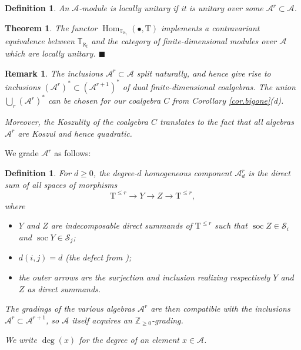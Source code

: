 \documentclass[11pt]{article}
\theoremstyle{plain}
\newtheorem{theorem}[lemma]{Theorem}
\theoremstyle{nonumberplain}
\theoremstyle{plain}
\newtheorem{definition}[lemma]{Definition}
\newtheorem{remark}[lemma]{Remark}
\theoremstyle{nonumberplain}
\newcommand\bT{\mathbb T}
\newcommand\cA{\mathcal A}
\newcommand\cS{\mathcal S}
\DeclareMathOperator{\Hom}{\mathrm{Hom}}
\DeclareMathOperator{\soc}{\mathrm{soc}}
\newcommand{\qedhere}{\mbox{}\hfill\ensuremath{\blacksquare}}
\begin{document}
\begin{definition}
  An $\cA$-module is {\it locally unitary} if it is unitary over some
  $\cA^r\subset \cA$.
\end{definition}


\begin{theorem}\label{th.kosz-fin-alg}
  The functor $\Hom_{\bT_{\aleph_t}}(\bullet,\mathrm{T})$ implements a contravariant
  equivalence between $\bT_{\aleph_t}$ and the category of
  finite-dimensional modules over $\cA$ which are locally
  unitary. \qedhere
\end{theorem}


\begin{remark}\label{re.coalg-choice}
  The inclusions $\cA^r\subset \cA$ split naturally, and hence give
  rise to inclusions $(\cA^r)^*\subset (\cA^{r+1})^*$ of dual
  finite-dimensional coalgebras. The union $\bigcup_r (\cA^r)^*$ can
  be chosen for our coalgebra $C$ from Corollary \ref{cor.bigone}(d).

  Moreover, the Koszulity of the coalgebra $C$ translates to the fact that all algebras 
  $\cA^r$ are Koszul and hence quadratic.
\end{remark}



We grade $\cA^r$ as follows:

\begin{definition}\label{def.grading}
  For $d\ge 0$, the degree-$d$ homogeneous component $\cA^r_d$ is the
  direct sum of all spaces of morphisms
\begin{equation*}
  \mathrm{T}^{\le r}\to Y\to Z\to \mathrm{T}^{\le r},
\end{equation*}
where 
\begin{itemize}
\item $Y$ and $Z$ are indecomposable direct summands of $\mathrm{T}^{\le r}$
  such that $\soc Z \in \cS_i$ and $\soc Y \in \cS_j$;
\item $d(i,j)=d$ (the defect from );
\item the outer arrows are the surjection and inclusion realizing respectively $Y$
  and $Z$ as direct summands.
\end{itemize}
The gradings of the various algebras $\cA^r$ are then compatible with
the inclusions $\cA^r\subset \cA^{r+1}$, so $\cA$ itself acquires an $\mathbb{Z}_{\geq0}$-grading.

We write $\deg(x)$ for the degree of an element $x\in \cA$.
\end{definition}
\end{document}
